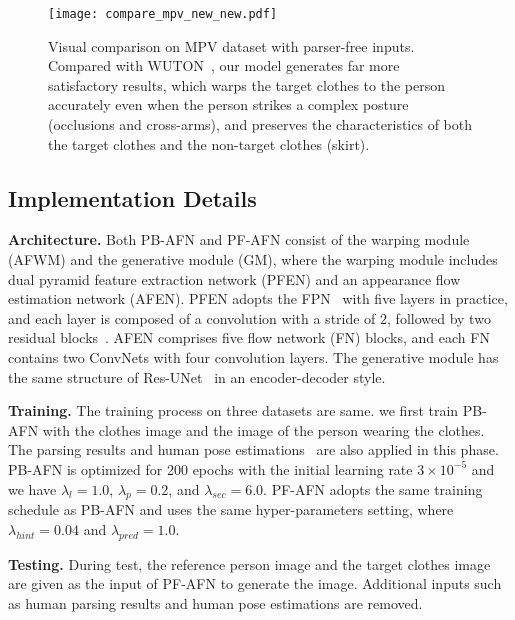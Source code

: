 \documentclass[final]{cvpr}
\begin{document}
	
	\begin{figure*}
		\begin{center}
			\texttt{[image: compare\_mpv\_new\_new.pdf]}
		\end{center}
		\vspace{-3mm}
		\caption{Visual comparison on MPV dataset with parser-free inputs. Compared with WUTON~\cite{parser_free}, our model generates far more satisfactory results, which warps the target clothes to the person accurately even when the person strikes a complex posture (\ie occlusions and cross-arms), and preserves the characteristics of both the target clothes and the non-target clothes (\ie skirt).}
		\vspace{-10pt}
		\label{fig:vis_mpv}
	\end{figure*}
	
	
	\subsection{Implementation Details}
	
	\textbf{Architecture.}
Both PB-AFN and PF-AFN consist of the warping module (AFWM) and the generative module (GM), where the warping module includes dual pyramid feature extraction network (PFEN) and an appearance flow estimation network (AFEN).
PFEN adopts the FPN~\cite{fpn} with five layers in practice, and each layer is composed of a convolution with a stride of $2$, followed by two residual blocks~\cite{resnet}.
AFEN comprises five flow network (FN) blocks, and each FN contains two ConvNets with four convolution layers.
The generative module has the same structure of Res-UNet~\cite{resunet} in an encoder-decoder style.

	\textbf{Training.}
The training process on three datasets are same.
we first train PB-AFN with the clothes image and the image of the person wearing the clothes. The parsing results and human pose estimations~\cite{densepose} are also applied in this phase.
PB-AFN is optimized for 200 epochs with the initial learning rate $3\times 10^{-5}$ and we have ${\lambda}_l =1.0 $, ${\lambda}_p=0.2$, and ${\lambda}_{sec}=6.0$.
PF-AFN adopts the same training schedule as PB-AFN and uses the same hyper-parameters setting, where ${\lambda}_{hint} =0.04 $ and ${\lambda}_{pred} =1.0 $.
	
	
	\textbf{Testing.}
During test, the reference person image and the target clothes image are given as the input of PF-AFN to generate the image. Additional inputs such as human parsing results and human pose estimations are removed.
	
\end{document}
